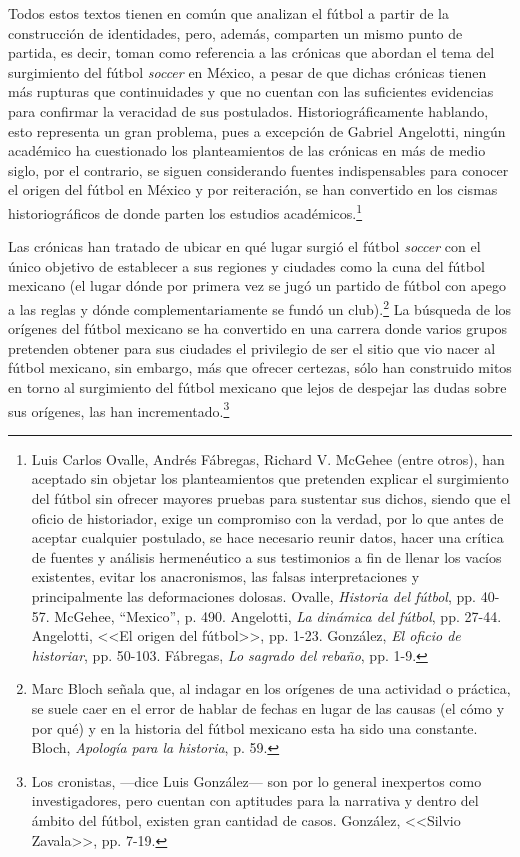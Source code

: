 \documentclass[11pt,a5paper,twoside]{book} %
\begin{document}
Todos estos textos tienen en común que analizan el fútbol a partir de la construcción
de identidades, pero, además, comparten un mismo punto de partida, es decir, toman como
referencia a las crónicas que abordan el tema del surgimiento del fútbol \emph{soccer} en México, a
pesar de que dichas crónicas tienen más rupturas que continuidades y que no cuentan con las
suficientes evidencias para confirmar la veracidad de sus postulados. Historiográficamente
hablando, esto representa un gran problema, pues a excepción de Gabriel Angelotti, ningún
académico ha cuestionado los planteamientos de las crónicas en más de medio siglo, por el
contrario, se siguen considerando fuentes indispensables para conocer el origen del fútbol en
México y por reiteración, se han convertido en los cismas historiográficos de donde parten
los estudios académicos.\footnote{Luis Carlos Ovalle, Andrés Fábregas, Richard V. McGehee (entre otros), han aceptado sin objetar los planteamientos que pretenden explicar el surgimiento del fútbol sin ofrecer mayores pruebas para sustentar sus dichos, siendo que el oficio de historiador, exige un compromiso con la verdad, por lo que antes de aceptar cualquier postulado, se hace necesario reunir datos, hacer una crítica de fuentes y análisis hermenéutico a sus testimonios a fin de llenar los vacíos existentes, evitar los anacronismos, las falsas interpretaciones y principalmente las deformaciones dolosas. Ovalle, \emph{Historia del fútbol}, pp. 40-57. McGehee, ``Mexico'', p. 490. Angelotti, \emph{La dinámica del fútbol}, pp. 27-44. Angelotti, <<El origen del fútbol>>, pp. 1-23. González, \emph{El oficio de historiar}, pp. 50-103. Fábregas, \emph{Lo sagrado del rebaño}, pp. 1-9.}

Las crónicas han tratado de ubicar en qué lugar surgió el fútbol \emph{soccer} con el único
objetivo de establecer a sus regiones y ciudades como la cuna del fútbol mexicano (el lugar
dónde por primera vez se jugó un partido de fútbol con apego a las reglas y dónde
complementariamente se fundó un club).\footnote{Marc Bloch señala que, al indagar en los orígenes de una actividad o práctica, se suele caer en el error de hablar de fechas en lugar de las causas (el cómo y por qué) y en la historia del fútbol mexicano esta ha sido una constante. Bloch, \emph{Apología para la historia}, p. 59.} La búsqueda de los orígenes del fútbol mexicano
se ha convertido en una carrera donde varios grupos pretenden obtener para sus ciudades el privilegio de ser el sitio que vio nacer al fútbol mexicano, sin embargo, más que ofrecer certezas, sólo han construido mitos en torno al surgimiento del fútbol mexicano que lejos de despejar las dudas sobre sus orígenes, las han incrementado.\footnote{Los cronistas, ---dice Luis González--- son por lo general inexpertos como investigadores, pero cuentan con aptitudes para la narrativa y dentro del ámbito del fútbol, existen gran cantidad de casos. González, <<Silvio Zavala>>, pp. 7-19.}
\end{document}
